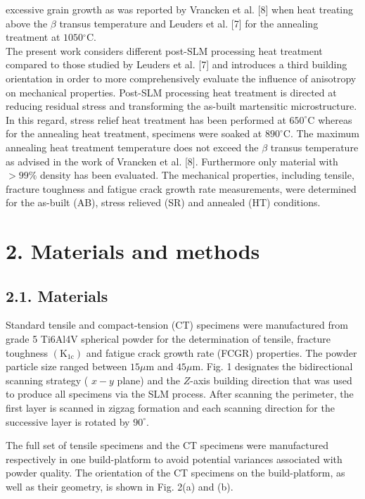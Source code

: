 \documentclass[10pt]{article}
\begin{document}
excessive grain growth as was reported by Vrancken et al. [8] when heat treating above the $\beta$ transus temperature and Leuders et al. [7] for the annealing treatment at $1050{ }^{\circ} \mathrm{C}$.\\
The present work considers different post-SLM processing heat treatment compared to those studied by Leuders et al. [7] and introduces a third building orientation in order to more comprehensively evaluate the influence of anisotropy on mechanical properties. Post-SLM processing heat treatment is directed at reducing residual stress and transforming the as-built martensitic microstructure. In this regard, stress relief heat treatment has been performed at $650^{\circ} \mathrm{C}$ whereas for the annealing heat treatment, specimens were soaked at $890^{\circ} \mathrm{C}$. The maximum annealing heat treatment temperature does not exceed the $\beta$ transus temperature as advised in the work of Vrancken et al. [8]. Furthermore only material with $>99 \%$ density has been evaluated. The mechanical properties, including tensile, fracture toughness and fatigue crack growth rate measurements, were determined for the as-built (AB), stress relieved (SR) and annealed (HT) conditions.

\section*{2. Materials and methods}
\subsection*{2.1. Materials}
Standard tensile and compact-tension (CT) specimens were manufactured from grade 5 Ti6Al4V spherical powder for the determination of tensile, fracture toughness $\left(\mathrm{K}_{1 \mathrm{c}}\right)$ and fatigue crack growth rate (FCGR) properties. The powder particle size ranged between $15 \mu \mathrm{m}$ and $45 \mu \mathrm{m}$. Fig. 1 designates the bidirectional scanning strategy ( $x-y$ plane) and the $Z$-axis building direction that was used to produce all specimens via the SLM process. After scanning the perimeter, the first layer is scanned in zigzag formation and each scanning direction for the successive layer is rotated by $90^{\circ}$.

The full set of tensile specimens and the CT specimens were manufactured respectively in one build-platform to avoid potential variances associated with powder quality. The orientation of the CT specimens on the build-platform, as well as their geometry, is shown in Fig. 2(a) and (b).
\end{document}
